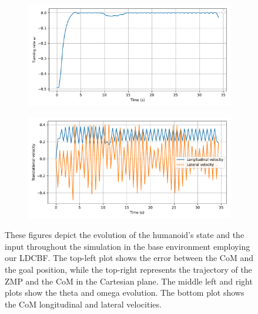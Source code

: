 \begin{figure}[H]
\begin{subfigure}{0.45\linewidth}
    \end{subfigure}
    \begin{subfigure}{0.45\linewidth}
        \centering
        \includegraphics[width=\linewidth]{figures/Simulations/sim1circles/evolution_3.pdf}
    \end{subfigure}
    \hfill
    \begin{subfigure}{0.45\linewidth}
        \centering
        \includegraphics[width=\linewidth]{figures/Simulations/sim1circles/evolution_1.pdf}
    \end{subfigure}
    \caption{These figures depict the evolution of the humanoid's state and the input throughout the simulation in the base environment employing our LDCBF. The top-left plot shows the error between the CoM and the goal position, while the top-right represents the trajectory of the ZMP and the CoM in the Cartesian plane. The middle left and right plots show the theta and omega evolution. The bottom plot shows the CoM longitudinal and lateral velocities.}
    \label{fig:sim1_evol}
\end{figure}

